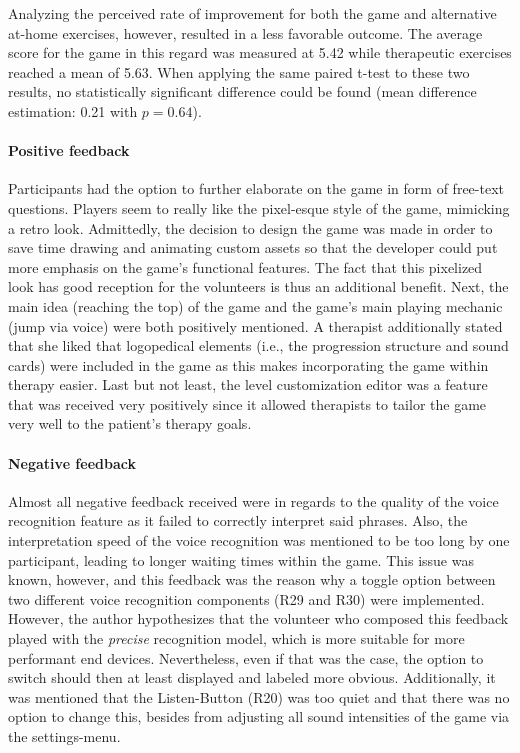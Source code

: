 \documentclass[draft,final]{vutinfth} %
\begin{document}
Analyzing the perceived rate of improvement for both the game and alternative at-home exercises, however, resulted in a less favorable outcome. The average score for the game in this regard was measured at 5.42 while therapeutic exercises reached a mean of 5.63. When applying the same paired t-test to these two results, no statistically significant difference could be found (mean difference estimation: 0.21 with $p=0.64$).

\paragraph{Positive feedback} Participants had the option to further elaborate on the game in form of free-text questions.  Players seem to really like the pixel-esque style of the game, mimicking a retro look. Admittedly, the decision to design the game was made in order to save time drawing and animating custom assets so that the developer could put more emphasis on the game's functional features. The fact that this pixelized look has good reception for the volunteers is thus an additional benefit. Next, the main idea (reaching the top) of the game and the game's main playing mechanic (jump via voice) were both positively mentioned. A therapist additionally stated that she liked that logopedical elements (i.e., the progression structure and sound cards) were included in the game as this makes incorporating the game within therapy easier. Last but not least, the level customization editor was a feature that was received very positively since it allowed therapists to tailor the game very well to the patient's therapy goals.

\paragraph{Negative feedback} Almost all negative feedback received were in regards to the quality of the voice recognition feature as it failed to correctly interpret said phrases. Also, the interpretation speed of the voice recognition was mentioned to be too long by one participant, leading to longer waiting times within the game. This issue was known, however, and this feedback was the reason why a toggle option between two different voice recognition components (R29 and R30) were implemented. However, the author hypothesizes that the volunteer who composed this feedback played with the \emph{precise} recognition model, which is more suitable for more performant end devices. Nevertheless, even if that was the case, the option to switch should then at least displayed and labeled more obvious. Additionally, it was mentioned that the Listen-Button (R20) was too quiet and that there was no option to change this, besides from adjusting all sound intensities of the game via the settings-menu.
\end{document}
